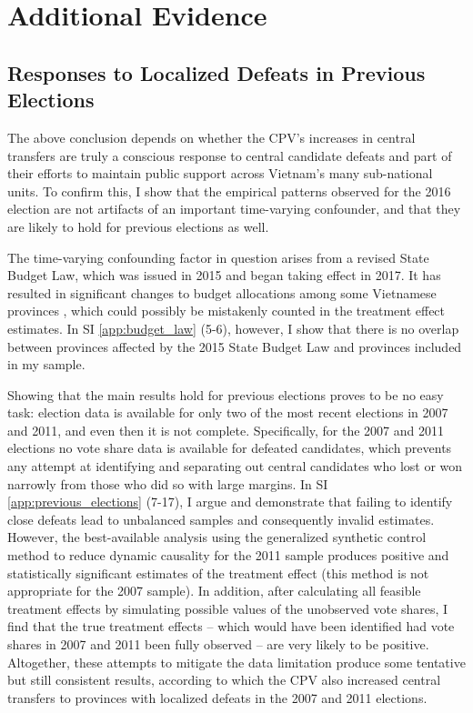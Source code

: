 \documentclass[12pt]{article}
\newcommand{\1}{\mathbbm{1}}
\begin{document}
\section{Additional Evidence}
\label{sec:additional}

\subsection{Responses to Localized Defeats in Previous Elections}

The above conclusion depends on whether the CPV's increases in central transfers are truly  a conscious response to central candidate defeats and part of their efforts to maintain public support across Vietnam's many sub-national units. To confirm this, I show that the empirical patterns observed for the 2016 election are not artifacts of an important time-varying confounder, and that they are likely to hold for previous elections as well.

The time-varying confounding factor in question arises from a revised State Budget Law, which was issued in 2015 and began taking effect in 2017. It has resulted in significant changes to budget allocations among some Vietnamese provinces \citep{BaoViet2016}, which could possibly be mistakenly counted in the treatment effect estimates. In SI \ref{app:budget_law} (5-6), however, I show that there is no overlap between provinces affected by the 2015 State Budget Law and provinces included in my sample.

Showing that the main results hold for previous elections proves to be no easy task: election data is available for only two of the most recent elections in 2007 and 2011, and even then it is not complete. Specifically, for the 2007 and 2011 elections no vote share data is available for defeated candidates, which prevents any attempt at identifying and separating out central candidates who lost or won narrowly from those who did so with large margins. In SI \ref{app:previous_elections} (7-17), I argue and demonstrate that failing to identify close defeats lead to unbalanced samples and consequently invalid estimates. However, the best-available analysis using the generalized synthetic control method to reduce dynamic causality for the 2011 sample produces positive and statistically significant estimates of the treatment effect (this method is not appropriate for the 2007 sample). In addition, after calculating all feasible treatment effects by simulating possible values of the unobserved vote shares, I find that the true treatment effects -- which would have been identified had vote shares in 2007 and 2011 been fully observed -- are very likely to be positive. Altogether, these attempts to mitigate the data limitation produce some tentative but still consistent results, according to which the CPV also increased central transfers to provinces with localized defeats in the 2007 and 2011 elections.
\end{document}
